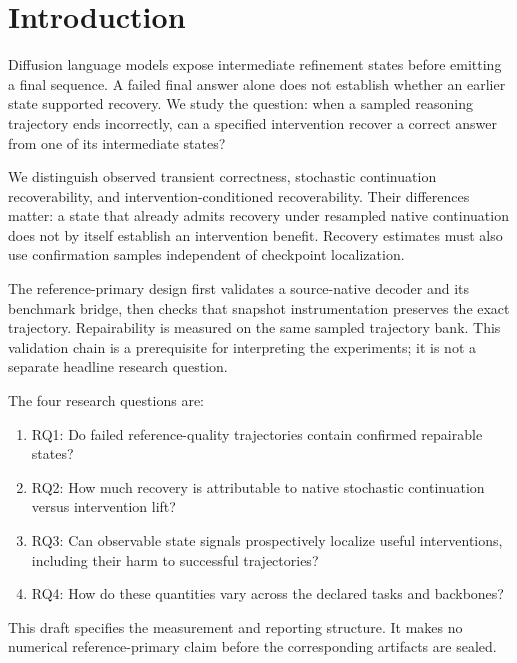 \section{Introduction}

Diffusion language models expose intermediate refinement states before emitting
a final sequence. A failed final answer alone does not establish whether an
earlier state supported recovery. We study the question: when a sampled
reasoning trajectory ends incorrectly, can a specified intervention recover a
correct answer from one of its intermediate states?

We distinguish observed transient correctness, stochastic continuation
recoverability, and intervention-conditioned recoverability. Their differences
matter: a state that already admits recovery under resampled native continuation
does not by itself establish an intervention benefit. Recovery estimates must
also use confirmation samples independent of checkpoint localization.

The reference-primary design first validates a source-native decoder and its
benchmark bridge, then checks that snapshot instrumentation preserves the exact
trajectory. Repairability is measured on the same sampled trajectory bank. This
validation chain is a prerequisite for interpreting the experiments; it is not
a separate headline research question.

The four research questions are:
\begin{enumerate}
\item RQ1: Do failed reference-quality trajectories contain confirmed repairable states?
\item RQ2: How much recovery is attributable to native stochastic continuation
versus intervention lift?
\item RQ3: Can observable state signals prospectively localize useful interventions,
including their harm to successful trajectories?
\item RQ4: How do these quantities vary across the declared tasks and backbones?
\end{enumerate}
This draft specifies the measurement and reporting structure. It makes no
numerical reference-primary claim before the corresponding artifacts are sealed.
